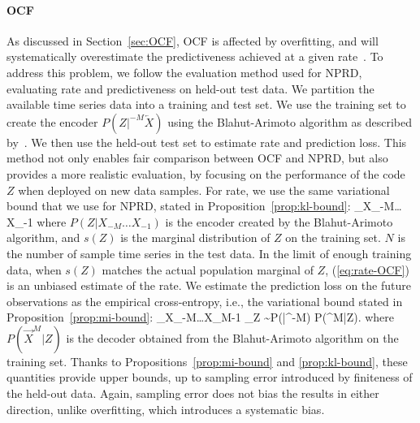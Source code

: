 \documentclass[entropy,article,submit,moreauthors,pdftex,10pt,a4paper]{Definitions/mdpi}
\newcommand{\E}[0]{\mathbb{E}}
\newcommand{\finitefuture}{\overrightarrow{X}^{M}}
\newcommand{\finitepast}{^{-M}\overleftarrow{X}}%
\let\oldequation\equation
\let\oldendequation\endequation
\renewenvironment{equation}
  {\linenomathNonumbers\oldequation}
  {\oldendequation\endlinenomath}
\begin{document}
\paragraph{OCF} As discussed in Section~\ref{sec:OCF}, OCF is affected by overfitting, 
and will systematically overestimate the predictiveness achieved at a given rate~\citep{still-optimal-2010}.
To address this problem, we follow the evaluation method used for NPRD, evaluating rate and predictiveness on held-out test data.
We partition the available time series data into a training and test set. We use the training set to create the encoder $P(Z|\finitepast)$ using the Blahut-Arimoto algorithm as described by~\citet{still-optimal-2010}.
We then use the held-out test set to estimate rate and prediction loss.
This method not only enables fair comparison between OCF and NPRD, but also provides a more realistic evaluation, by focusing on the performance of the code $Z$ when deployed on new data samples.
For rate, we use the same variational bound that we use for NPRD, stated in Proposition~\ref{prop:kl-bound}:
\begin{equation}\label{eq:rate-OCF}
 \sum_{X_{-M}\dots X_{-1} \in {}} 
\end{equation}
where $P(Z|X_{-M}\dots X_{-1})$ is the encoder created by the Blahut-Arimoto algorithm, and $s(Z)$ is the marginal distribution of $Z$ on the training set.
$N$ is the number of sample time series in the test data.
In the limit of enough training data, when $s(Z)$ matches the actual population marginal of $Z$, (\ref{eq:rate-OCF}) is an unbiased estimate of the rate. %
We estimate the prediction loss on the future observations as the empirical cross-entropy, i.e., the variational bound stated in Proposition~\ref{prop:mi-bound}:
\begin{equation}
 \sum_{X_{-M}\dots X_{M-1} \in {}} \E_{Z \sim P(\cdot|\finitepast)} \log P(\finitefuture|Z).
\end{equation}
where $P(\finitefuture|Z)$ is the decoder obtained from the Blahut-Arimoto algorithm on the training set.
Thanks to Propositions~\ref{prop:mi-bound} and \ref{prop:kl-bound}, these quantities provide upper bounds, up to sampling error introduced by finiteness of the held-out data.
Again, sampling error does not bias the results in either direction, unlike overfitting, which introduces a systematic bias.
\end{document}
